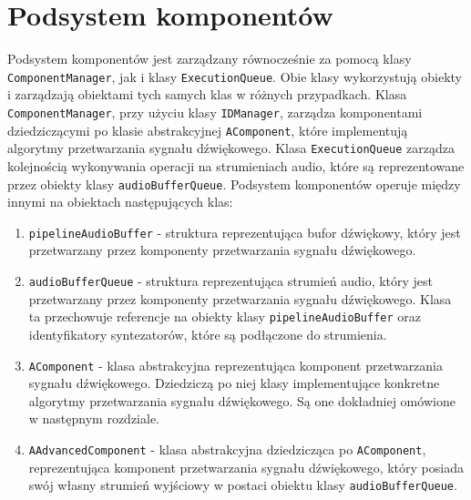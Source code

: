 \section{Podsystem komponentów}
Podsystem komponentów jest zarządzany równocześnie za pomocą klasy \texttt{ComponentManager}, jak i klasy \texttt{ExecutionQueue}. Obie klasy wykorzystują obiekty i zarządzają obiektami tych samych klas w różnych przypadkach. Klasa \texttt{ComponentManager}, przy użyciu klasy \texttt{IDManager}, zarządza komponentami dziedziczącymi po klasie abstrakcyjnej \texttt{AComponent}, które implementują algorytmy przetwarzania sygnału dźwiękowego. Klasa \texttt{ExecutionQueue} zarządza kolejnością wykonywania operacji na strumieniach audio, które są reprezentowane przez obiekty klasy \texttt{audioBufferQueue}. Podsystem komponentów operuje między innymi na obiektach następujących klas:
\begin{enumerate}
    \item \texttt{pipelineAudioBuffer} - struktura reprezentująca bufor dźwiękowy, który jest przetwarzany przez komponenty przetwarzania sygnału dźwiękowego.
    \item \texttt{audioBufferQueue} - struktura reprezentująca strumień audio, który jest przetwarzany przez komponenty przetwarzania sygnału dźwiękowego. Klasa ta przechowuje referencje na obiekty klasy \texttt{pipelineAudioBuffer} oraz identyfikatory syntezatorów, które są podłączone do strumienia.
    \item \texttt{AComponent} - klasa abstrakcyjna reprezentująca komponent przetwarzania sygnału dźwiękowego. Dziedziczą po niej klasy implementujące konkretne algorytmy przetwarzania sygnału dźwiękowego. Są one dokładniej omówione w następnym rozdziale.
    \item \texttt{AAdvancedComponent} - klasa abstrakcyjna dziedzicząca po \texttt{AComponent}, reprezentująca komponent przetwarzania sygnału dźwiękowego, który posiada swój własny strumień wyjściowy w postaci obiektu klasy \texttt{audioBufferQueue}. 
\end{enumerate}

